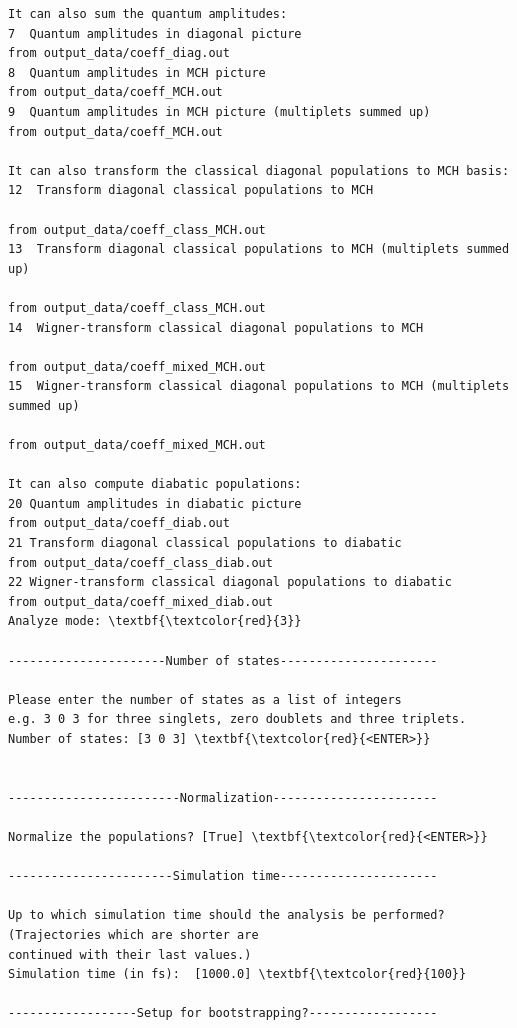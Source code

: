 \documentclass[a4paper,11pt,DIV=15,openany]{scrbook}
\begin{document}
\begin{oframed}
\begin{Verbatim}[commandchars=\\\{\}]
It can also sum the quantum amplitudes:
7  Quantum amplitudes in diagonal picture                                    from output_data/coeff_diag.out
8  Quantum amplitudes in MCH picture                                         from output_data/coeff_MCH.out
9  Quantum amplitudes in MCH picture (multiplets summed up)                  from output_data/coeff_MCH.out

It can also transform the classical diagonal populations to MCH basis:
12  Transform diagonal classical populations to MCH
                                                                        from output_data/coeff_class_MCH.out
13  Transform diagonal classical populations to MCH (multiplets summed up)
                                                                        from output_data/coeff_class_MCH.out 
14  Wigner-transform classical diagonal populations to MCH
                                                                        from output_data/coeff_mixed_MCH.out
15  Wigner-transform classical diagonal populations to MCH (multiplets summed up)
                                                                        from output_data/coeff_mixed_MCH.out

It can also compute diabatic populations:
20 Quantum amplitudes in diabatic picture                              from output_data/coeff_diab.out
21 Transform diagonal classical populations to diabatic                from output_data/coeff_class_diab.out
22 Wigner-transform classical diagonal populations to diabatic         from output_data/coeff_mixed_diab.out
Analyze mode: \textbf{\textcolor{red}{3}}

----------------------Number of states----------------------

Please enter the number of states as a list of integers
e.g. 3 0 3 for three singlets, zero doublets and three triplets.
Number of states: [3 0 3] \textbf{\textcolor{red}{<ENTER>}}


------------------------Normalization-----------------------

Normalize the populations? [True] \textbf{\textcolor{red}{<ENTER>}}

-----------------------Simulation time----------------------

Up to which simulation time should the analysis be performed? (Trajectories which are shorter are 
continued with their last values.)
Simulation time (in fs):  [1000.0] \textbf{\textcolor{red}{100}}

------------------Setup for bootstrapping?------------------


\end{Verbatim}
\end{oframed}
\end{document}
